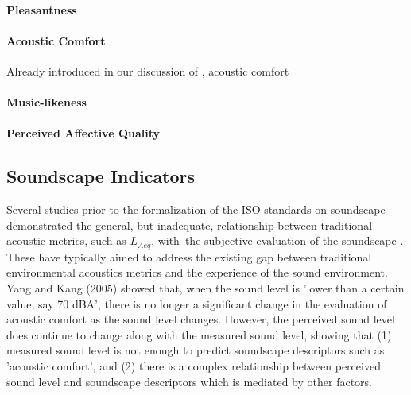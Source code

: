 \paragraph{Pleasantness} 

\paragraph{Acoustic Comfort}
Already introduced in our discussion of \citet{Yang2005Acoustic}, acoustic comfort 

\paragraph{Music-likeness}

\paragraph{Perceived Affective Quality} 

\subsection{Soundscape Indicators}
Several studies prior to the formalization of the ISO standards on soundscape demonstrated the general, but inadequate, relationship between traditional acoustic metrics, such as $L_{Aeq}$, with~the subjective evaluation of the soundscape \citep{Berglund2006Tool,Yang2005Acoustic,Rychtarikova2013Soundscape,Aumond2017Modeling,AlsinaPages2021Perceptual}. These have typically aimed to address the existing gap between traditional environmental acoustics metrics and the experience of the sound environment. Yang and Kang (2005) showed that, when the sound level is 'lower than a certain value, say 70 dBA', there is no longer a significant change in the evaluation of acoustic comfort as the sound level changes. However, the perceived sound level does continue to change along with the measured sound level, showing that (1) measured sound level is not enough to predict soundscape descriptors such as 'acoustic comfort', and (2) there is a complex relationship between perceived sound level and soundscape descriptors which is mediated by other factors.

